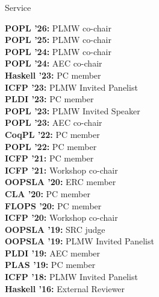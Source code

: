 \documentclass{resume} %
\begin{document}

\newcommand{\serve}[2]{
  {\bf #1:} #2 \\
  }


\begin{rSection}{Service}

  \serve{POPL '26}{PLMW co-chair}
  \serve{POPL '25}{PLMW co-chair}
  \serve{POPL '24}{PLMW co-chair}
  \serve{POPL '24}{AEC co-chair}  
  \serve{Haskell '23}{PC member}  
  \serve{ICFP '23}{PLMW Invited Panelist}
  \serve{PLDI '23}{PC member}
  \serve{POPL '23}{PLMW Invited Speaker}  
  \serve{POPL '23}{AEC co-chair}
  \serve{CoqPL '22}{PC member}
  \serve{POPL '22}{PC member}
  \serve{ICFP '21}{PC member}
  \serve{ICFP '21}{Workshop co-chair}
  \serve{OOPSLA '20}{ERC member}
  \serve{CLA '20}{PC member}
  \serve{FLOPS '20}{PC member}
  \serve{ICFP '20}{Workshop co-chair}
  \serve{OOPSLA '19}{SRC judge}
  \serve{OOPSLA '19}{PLMW Invited Panelist}
  \serve{PLDI '19}{AEC member}
  \serve{PLAS '19}{PC member}
  \serve{ICFP '18}{PLMW Invited Panelist}
  \serve{Haskell '16}{External Reviewer}
  
\end{rSection}

\end{document}
